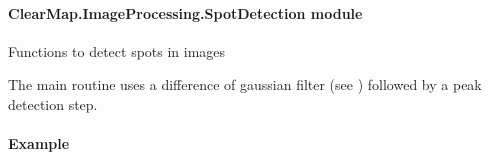 \documentclass[letterpaper,10pt,english]{sphinxmanual}
\begin{document}
\paragraph{ClearMap.ImageProcessing.SpotDetection module}
\label{api/ClearMap.ImageProcessing:clearmap-imageprocessing-spotdetection-module}\label{api/ClearMap.ImageProcessing:module-ClearMap.ImageProcessing.SpotDetection}
Functions to detect spots in images

The main routine  uses a difference of gaussian filter (see
{\hyperref[api/ClearMap.ImageProcessing.Filter:module-ClearMap.ImageProcessing.Filter]{\emph{}}}) followed by a peak detection step.
\paragraph{Example}
\end{document}
